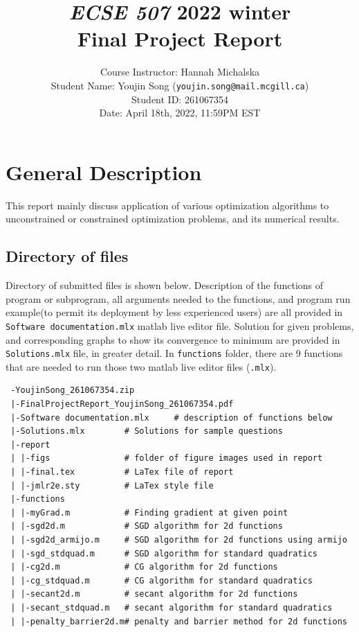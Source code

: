 \documentclass[twoside,11pt]{article}
\begin{document}
\title{\textit{ECSE 507} 2022 winter \\Final Project Report}
\author{Course Instructor: Hannah Michalska  \\ Student Name: Youjin Song (\texttt{youjin.song@mail.mcgill.ca}) \\ Student ID: 261067354 \\ Date: April 18th, 2022, 11:59PM EST}

\maketitle

\section{General Description}
This report mainly discuss application of various optimization algorithms to unconstrained or constrained optimization problems, and its numerical results. 
\subsection{Directory of files}
Directory of submitted files is shown below. Description of the functions of program or subprogram, all arguments needed to the functions, and program run example(to permit its deployment by less experienced users) are all provided in \texttt{Software documentation.mlx} matlab live editor file. Solution for given problems, and corresponding graphs to show its convergence to minimum are provided in \texttt{Solutions.mlx} file, in greater detail. In \texttt{functions} folder, there are 9 functions that are needed to run those two matlab live editor files (\texttt{.mlx}). 
\begin{verbatim}
 -YoujinSong_261067354.zip
 |-FinalProjectReport_YoujinSong_261067354.pdf  
 |-Software documentation.mlx     # description of functions below
 |-Solutions.mlx        # Solutions for sample questions
 |-report            
 | |-figs               # folder of figure images used in report
 | |-final.tex          # LaTex file of report
 | |-jmlr2e.sty         # LaTex style file
 |-functions
 | |-myGrad.m           # Finding gradient at given point
 | |-sgd2d.m            # SGD algorithm for 2d functions
 | |-sgd2d_armijo.m     # SGD algorithm for 2d functions using armijo
 | |-sgd_stdquad.m      # SGD algorithm for standard quadratics
 | |-cg2d.m             # CG algorithm for 2d functions
 | |-cg_stdquad.m       # CG algorithm for standard quadratics
 | |-secant2d.m         # secant algorithm for 2d functions
 | |-secant_stdquad.m   # secant algorithm for standard quadratics
 | |-penalty_barrier2d.m# penalty and barrier method for 2d functions
\end{verbatim}
\end{document}
